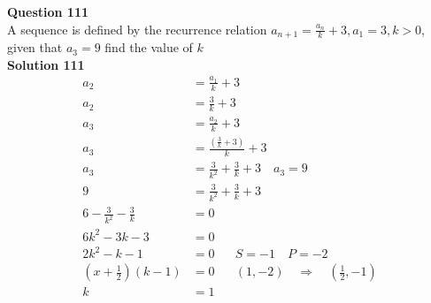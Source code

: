 \documentclass{article}
\begin{document}
\noindent\textbf{Question 111}\\[5pt]
A sequence is defined by the recurrence relation $a_{n+1}=\displaystyle\frac{a_n}{k}+3, a_1=3,k>0$, given that $a_3=9$ find the value of $k$\\[5pt]
\noindent\textbf{Solution 111}\\[5pt]
\begin{align*}
a_2&=\displaystyle\frac{a_1}{k}+3\\[2pt]
a_2&=\displaystyle\frac{3}{k}+3\\[12pt]
a_3&=\displaystyle\frac{a_2}{k}+3\\[2pt]
a_3&=\displaystyle\frac{\left(\displaystyle\frac{3}{k}+3\right)}{k}+3\\[2pt]
a_3&=\displaystyle\frac{3}{k^2}+\frac{3}{k}+3\quad a_3=9\\[12pt]
9&=\displaystyle\frac{3}{k^2}+\frac{3}{k}+3\\[2pt]
6-\displaystyle\frac{3}{k^2}-\frac{3}{k}&=0\\[2pt]
6k^2-3k-3&=0\\[2pt]
2k^2-k-1&=0\hspace{20pt}S=-1\quad P=-2\\[2pt]
\left(x+\displaystyle\frac{1}{2}\right)(k-1)&=0\hspace{20pt} (1,-2) \quad \Rightarrow \quad \left(\displaystyle\frac{1}{2},-1\right)\\[2pt]
k&=1\\
\end{align*}\\[10pt]
\end{document}
